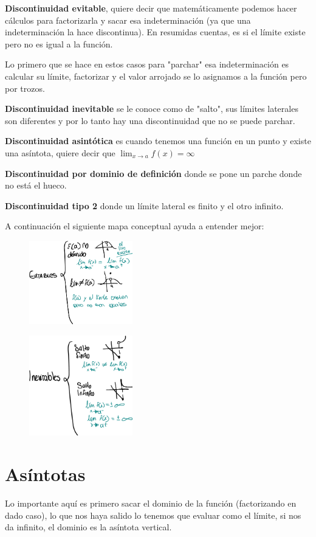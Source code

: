 \documentclass[letterpaper,12pt]{article}
\begin{document}
\begin{sloppypar}
\textbf{Discontinuidad evitable}, quiere decir que matemáticamente podemos hacer cálculos para factorizarla y sacar esa indeterminación (ya que una indeterminación la hace discontinua). En resumidas cuentas, es si el límite existe pero no es igual a la función. 

Lo primero que se hace en estos casos para "parchar" esa indeterminación es calcular su límite, factorizar y el valor arrojado se lo asignamos a la función pero por trozos.

\textbf{Discontinuidad inevitable} se le conoce como de "salto", sus límites laterales son diferentes y por lo tanto hay una discontinuidad que no se puede parchar.

\textbf{Discontinuidad asintótica} es cuando tenemos una función en un punto y existe una asíntota, quiere decir que $\lim_{x \to a} f(x) = \infty $

\textbf{Discontinuidad por dominio de definición} donde se pone un parche donde no está el hueco. 

\textbf{Discontinuidad tipo 2} donde un límite lateral es finito y el otro infinito. 

A continuación el siguiente mapa conceptual ayuda a entender mejor:
\begin{figure}[H]
    \centering
    \includegraphics[width=0.4\textwidth]{images/evitb.PNG}
\end{figure}
\begin{figure}[H]
    \centering
    \includegraphics[width=0.4\textwidth]{images/inev.PNG}
\end{figure}
\section{Asíntotas}
Lo importante aquí es primero sacar el dominio de la función (factorizando en dado caso), lo que nos haya salido lo tenemos que evaluar como el límite, si nos da infinito, el dominio es la asíntota vertical.


\end{sloppypar}
\end{document}
